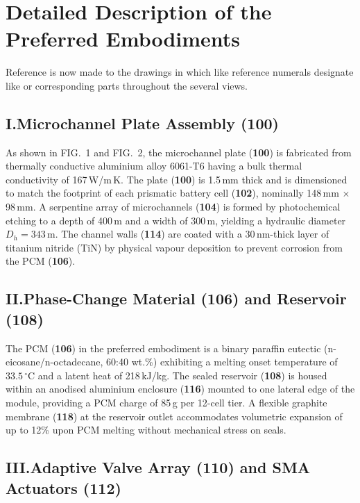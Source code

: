 \section{Detailed Description of the Preferred Embodiments}

Reference is now made to the drawings in which like reference numerals designate like or
corresponding parts throughout the several views.

\subsection*{I.\quad Microchannel Plate Assembly (100)}

As shown in FIG.~1 and FIG.~2, the microchannel plate (\textbf{100}) is fabricated from
thermally conductive aluminium alloy 6061-T6 having a bulk thermal conductivity of
167\,W/m\,K. The plate (\textbf{100}) is 1.5\,mm thick and is dimensioned to match the
footprint of each prismatic battery cell (\textbf{102}), nominally 148\,mm $\times$ 98\,mm.
A serpentine array of microchannels (\textbf{104}) is formed by photochemical etching to a
depth of 400\,\textmu m and a width of 300\,\textmu m, yielding a hydraulic diameter
$D_h = 343$\,\textmu m. The channel walls (\textbf{114}) are coated with a
30\,nm-thick layer of titanium nitride (TiN) by physical vapour deposition to prevent
corrosion from the PCM (\textbf{106}).

\subsection*{II.\quad Phase-Change Material (106) and Reservoir (108)}

The PCM (\textbf{106}) in the preferred embodiment is a binary paraffin eutectic
(n-eicosane/n-octadecane, 60:40 wt.\%) exhibiting a melting onset temperature of
$33.5\,^{\circ}\mathrm{C}$ and a latent heat of 218\,kJ/kg. The sealed reservoir (\textbf{108}) is
housed within an anodised aluminium enclosure (\textbf{116}) mounted to one lateral edge of
the module, providing a PCM charge of 85\,g per 12-cell tier. A flexible graphite membrane
(\textbf{118}) at the reservoir outlet accommodates volumetric expansion of up to 12\% upon
PCM melting without mechanical stress on seals.

\subsection*{III.\quad Adaptive Valve Array (110) and SMA Actuators (112)}

